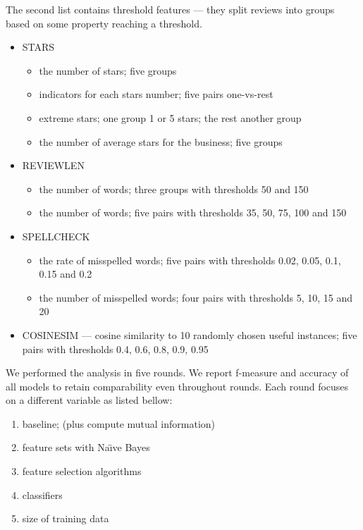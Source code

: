 The second list contains threshold features --- they split reviews into groups based on some property reaching a threshold.

\begin{itemize}
	\item STARS 
		\begin{itemize}
			\item the number of stars; five groups
			\item indicators for each stars number; five pairs one-vs-rest
			\item extreme stars; one group 1 or 5 stars; the rest another group
			\item the number of average stars for the business; five groups
		\end{itemize}
	\item REVIEWLEN 
		\begin{itemize}
			\item the number of words; three groups with thresholds 50 and 150
			\item the number of words; five pairs with thresholds 35, 50, 75, 100 and 150
		\end{itemize}
	\item SPELLCHECK 
		\begin{itemize}
			\item the rate of misspelled words; five pairs with thresholds 0.02, 0.05, 0.1, 0.15 and 0.2
			\item the number of misspelled words; four pairs with thresholds 5, 10, 15 and 20
		\end{itemize}
	
	\item COSINESIM --- cosine similarity to 10 randomly chosen useful instances; five pairs with thresholds 0.4, 0.6, 0.8, 0.9, 0.95
\end{itemize}

We performed the analysis in five rounds.
We report f-measure and accuracy of all models to retain comparability even throughout rounds.
Each round focuses on a different variable as listed bellow:

\begin{enumerate}
	\item baseline; (plus compute mutual information)
	\item feature sets with Na\"{\i}ve Bayes
	\item feature selection algorithms
	\item classifiers
	\item size of training data
\end{enumerate}


